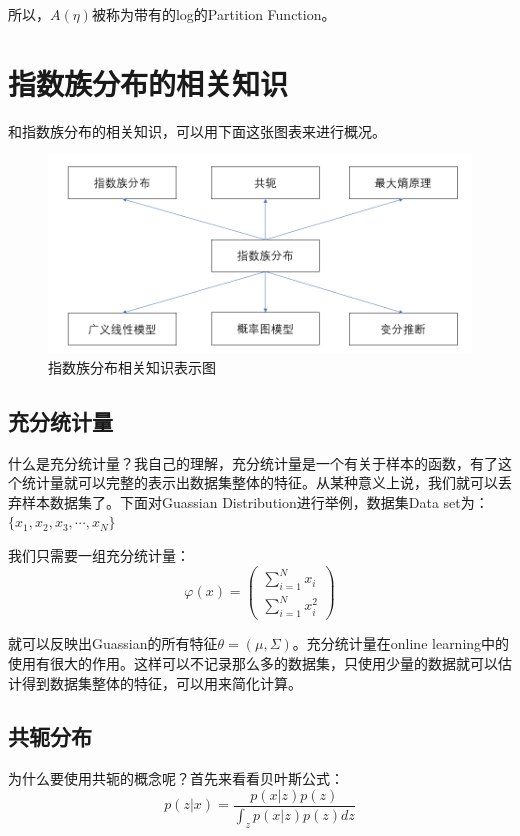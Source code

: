 \documentclass[a4paper]{article}
\begin{document}
所以，$A(\eta)$被称为带有的log的Partition Function。 

\section{指数族分布的相关知识}
和指数族分布的相关知识，可以用下面这张图表来进行概况。
\begin{figure}[H]
    \centering
    \includegraphics[width=.8\textwidth]{微信图片_20191022170308.png}
    \caption{指数族分布相关知识表示图}
    \label{fig:my_label_1}
\end{figure}

\subsection{充分统计量}
什么是充分统计量？我自己的理解，充分统计量是一个有关于样本的函数，有了这个统计量就可以完整的表示出数据集整体的特征。从某种意义上说，我们就可以丢弃样本数据集了。下面对Guassian Distribution进行举例，数据集Data set为：$\{x_1,x_2,x_3,\cdots ,x_N\}$

我们只需要一组充分统计量：
\begin{equation}
    \varphi(x) = 
    \begin{pmatrix}
        \sum_{i=1}^Nx_i \\
        \sum_{i=1}^Nx_i^2
    \end{pmatrix}
\end{equation}

就可以反映出Guassian的所有特征$\theta=(\mu, \Sigma)$。充分统计量在online learning中的使用有很大的作用。这样可以不记录那么多的数据集，只使用少量的数据就可以估计得到数据集整体的特征，可以用来简化计算。

\subsection{共轭分布}
为什么要使用共轭的概念呢？首先来看看贝叶斯公式：
\begin{equation}
    p(z|x)=\frac{p(x|z)p(z)}{\int_{z}p(x|z)p(z)dz}
\end{equation}
\end{document}
